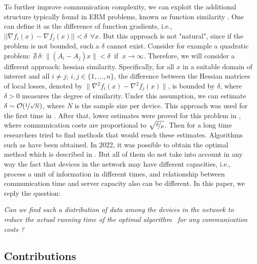 \documentclass{article}
\begin{document}
To further improve communication complexity, we can exploit the additional structure typically found in ERM problems, known as function similarity \cite{arjevani2015communication, shamir2014communication, matsushima2014distributed}. One can define it as the difference of function gradients, i.e., $||\nabla f_i (x) - \nabla f_j (x)|| < \delta ~~  \forall x$. But this approach is not "natural", since if the problem is not bounded, such a $\delta$ cannot exist. Consider for example a quadratic problem: $\nexists~ \delta: \|(A_i - A_j)x\| < \delta~$  if $~ x\rightarrow \infty$. Therefore, we will consider a different approach: hessian similarity. Specifically, for all $x$ in a suitable domain of interest and all $i \neq j; ~ i,j \in \{1,\ldots,n\}$, the difference between the Hessian matrices of local losses, denoted by $\|\nabla ^2 f_i(x) - \nabla ^2 f_j(x)\|$, is bounded by $\delta$, where $\delta > 0$ measures the degree of similarity. Under this assumption, we can estimate $\delta \sim \mathcal O(\nicefrac{1}{\sqrt{N}})$, where $N$ is the sample size per device. This approach was used for the first time in \cite{shamir2014communication}.  After that, lower estimates were proved for this problem in \cite{arjevani2015communication}, where communication costs are proportional to $\sqrt{\nicefrac{\delta}{\mu}}$. Then for a long time researchers tried to find methods that would reach these estimates. Algorithms such as \cite{tian2022acceleration, sun2022distributed, reddi2016aide, hendrikx2020statistically, beznosikov2021distributed} have been obtained. In 2022, it was possible to obtain the optimal method which is described in \cite{kovalev2022optimal}. But all of them do not take into account in any way the fact that devices in the network may have different capacities, i.e., process a unit of information in different times, and relationship between communication time
and server capacity also can be different. In this paper, we reply the question: 
\begin{center}
    \textit{ Can we find such a distribution of data among the devices in the network to reduce the actual running time of the optimal algorithm} \citep{kovalev2022optimal}\textit{~for any communication costs ?}
\end{center}

\subsection{Contributions}
\end{document}
